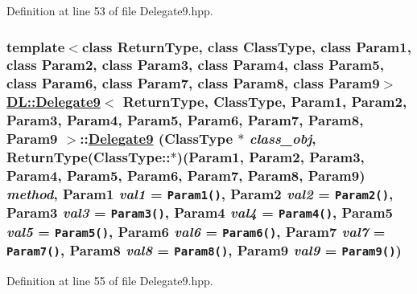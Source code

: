 Definition at line 53 of file Delegate9.hpp.\hypertarget{classDL_1_1Delegate9_a0}{
\subsubsection[Delegate9]{\setlength{\rightskip}{0pt plus 5cm}template$<$class Return\-Type, class Class\-Type, class Param1, class Param2, class Param3, class Param4, class Param5, class Param6, class Param7, class Param8, class Param9$>$ \hyperlink{classDL_1_1Delegate9}{DL::Delegate9}$<$ Return\-Type, Class\-Type, Param1, Param2, Param3, Param4, Param5, Param6, Param7, Param8, Param9 $>$::\hyperlink{classDL_1_1Delegate9}{Delegate9} (Class\-Type $\ast$ {\em class\_\-obj}, Return\-Type(Class\-Type::$\ast$)(Param1, Param2, Param3, Param4, Param5, Param6, Param7, Param8, Param9) {\em method}, Param1 {\em val1} = {\tt Param1()}, Param2 {\em val2} = {\tt Param2()}, Param3 {\em val3} = {\tt Param3()}, Param4 {\em val4} = {\tt Param4()}, Param5 {\em val5} = {\tt Param5()}, Param6 {\em val6} = {\tt Param6()}, Param7 {\em val7} = {\tt Param7()}, Param8 {\em val8} = {\tt Param8()}, Param9 {\em val9} = {\tt Param9()})}}
\label{classDL_1_1Delegate9_a0}




Definition at line 55 of file Delegate9.hpp.

